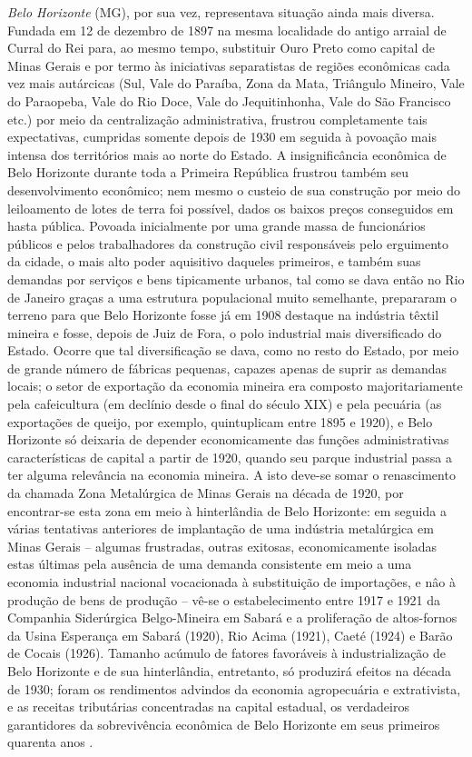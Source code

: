 \textit{Belo Horizonte} (MG), por sua vez, representava situação ainda mais diversa. Fundada em 12 de dezembro de 1897 na mesma localidade do antigo arraial de Curral do Rei para, ao mesmo tempo, substituir Ouro Preto como capital de Minas Gerais e por termo às iniciativas separatistas de regiões econômicas cada vez mais autárcicas (Sul, Vale do Paraíba, Zona da Mata, Triângulo Mineiro, Vale do Paraopeba, Vale do Rio Doce, Vale do Jequitinhonha, Vale do São Francisco etc.) por meio da centralização administrativa, frustrou completamente tais expectativas, cumpridas somente depois de 1930 em seguida à povoação mais intensa dos territórios mais ao norte do Estado. A insignificância econômica de Belo Horizonte durante toda a Primeira República frustrou também seu desenvolvimento econômico; nem mesmo o custeio de sua construção por meio do leiloamento de lotes de terra foi possível, dados os baixos preços conseguidos em hasta pública. Povoada inicialmente por uma grande massa de funcionários públicos e pelos trabalhadores da construção civil responsáveis pelo erguimento da cidade, o mais alto poder aquisitivo daqueles primeiros, e também suas demandas por serviços e bens tipicamente urbanos, tal como se dava então no Rio de Janeiro graças a uma estrutura populacional muito semelhante, prepararam o terreno para que Belo Horizonte fosse já em 1908 destaque na indústria têxtil mineira e fosse, depois de Juiz de Fora, o polo industrial mais diversificado do Estado. Ocorre que tal diversificação se dava, como no resto do Estado, por meio de grande número de fábricas pequenas, capazes apenas de suprir as demandas locais; o setor de exportação da economia mineira era composto majoritariamente pela cafeicultura (em declínio desde o final do século XIX) e pela pecuária (as exportações de queijo, por exemplo, quintuplicam entre 1895 e 1920), e Belo Horizonte só deixaria de depender economicamente das funções administrativas características de capital a partir de 1920, quando seu parque industrial passa a ter alguma relevância na economia mineira. A isto deve-se somar o renascimento da chamada Zona Metalúrgica de Minas Gerais na década de 1920, por encontrar-se esta zona em meio à hinterlândia de Belo Horizonte: em seguida a várias tentativas anteriores de implantação de uma indústria metalúrgica em Minas Gerais -- algumas frustradas, outras exitosas, economicamente isoladas estas últimas pela ausência de uma demanda consistente em meio a uma economia industrial nacional vocacionada à substituição de importações, e nâo à produção de bens de produção -- vê-se o estabelecimento entre 1917 e 1921 da Companhia Siderúrgica Belgo-Mineira em Sabará e a proliferação de altos-fornos da Usina Esperança em Sabará (1920), Rio Acima (1921), Caeté (1924) e Barão de Cocais (1926). Tamanho acúmulo de fatores favoráveis à industrialização de Belo Horizonte e de sua hinterlândia, entretanto, só produzirá efeitos na década de 1930; foram os rendimentos advindos da economia agropecuária e extrativista, e as receitas tributárias concentradas na capital estadual, os verdadeiros garantidores da sobrevivência econômica de Belo Horizonte em seus primeiros quarenta anos \cite[p.199-257]{singer_evourb_1968}.

